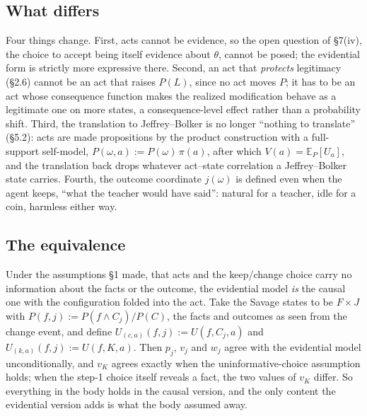 \documentclass[11pt,a4paper]{article}
\begin{document}
\subsection{What differs}
Four things change. First, acts cannot be evidence, so the open question of \S7(iv), the choice to accept being itself evidence about $\theta$, cannot be posed; the evidential form is strictly more expressive there. Second, an act that \emph{protects} legitimacy (\S2.6) cannot be an act that raises $P(L)$, since no act moves $P$; it has to be an act whose consequence function makes the realized modification behave as a legitimate one on more states, a consequence-level effect rather than a probability shift. Third, the translation to Jeffrey--Bolker is no longer ``nothing to translate'' (\S5.2): acts are made propositions by the product construction with a full-support self-model, $P(\omega, a) := P(\omega)\,\pi(a)$, after which $V(a) = \mathbb E_P[ U_a]$, and the translation back drops whatever act--state correlation a Jeffrey--Bolker state carries. Fourth, the outcome coordinate $j(\omega)$ is defined even when the agent keeps, ``what the teacher would have said'': natural for a teacher, idle for a coin, harmless either way.

\subsection{The equivalence}
Under the assumptions \S1 made, that acts and the keep/change choice carry no information about the facts or the outcome, the evidential model \emph{is} the causal one with the configuration folded into the act. Take the Savage states to be $F \times J$ with $P(f, j) := P(f \wedge C_j)/P(C)$, the facts and outcomes as seen from the change event, and define $U_{(c,a)}(f, j) := U(f, C_j, a)$ and $U_{(k,a)}(f, j) := U(f, K, a)$. Then $p_j$, $v_j$ and $w_j$ agree with the evidential model unconditionally, and $v_K$ agrees exactly when the uninformative-choice assumption holds; when the step-1 choice itself reveals a fact, the two values of $v_K$ differ. So everything in the body holds in the causal version, and the only content the evidential version adds is what the body assumed away.
\end{document}
